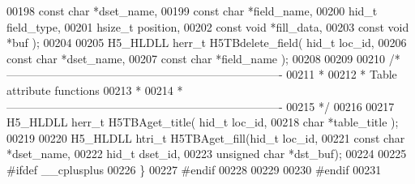 \begin{DoxyCode}
00198                          \textcolor{keyword}{const} \textcolor{keywordtype}{char} *dset\_name,
00199                          \textcolor{keyword}{const} \textcolor{keywordtype}{char} *field\_name,
00200                          hid\_t field\_type,
00201                          hsize\_t position,
00202                          \textcolor{keyword}{const} \textcolor{keywordtype}{void} *fill\_data,
00203                          \textcolor{keyword}{const} \textcolor{keywordtype}{void} *buf );
00204 
00205 H5\_HLDLL herr\_t  H5TBdelete\_field( hid\_t loc\_id,
00206                          \textcolor{keyword}{const} \textcolor{keywordtype}{char} *dset\_name,
00207                          \textcolor{keyword}{const} \textcolor{keywordtype}{char} *field\_name );
00208 
00209 
00210 \textcolor{comment}{/*-------------------------------------------------------------------------}
00211 \textcolor{comment}{ *}
00212 \textcolor{comment}{ * Table attribute functions}
00213 \textcolor{comment}{ *}
00214 \textcolor{comment}{ *-------------------------------------------------------------------------}
00215 \textcolor{comment}{ */}
00216 
00217 H5\_HLDLL herr\_t  H5TBAget\_title( hid\_t loc\_id,
00218                        \textcolor{keywordtype}{char} *table\_title );
00219 
00220 H5\_HLDLL htri\_t  H5TBAget\_fill(hid\_t loc\_id,
00221                       \textcolor{keyword}{const} \textcolor{keywordtype}{char} *dset\_name,
00222                       hid\_t dset\_id,
00223                       \textcolor{keywordtype}{unsigned} \textcolor{keywordtype}{char} *dst\_buf);
00224 
00225 \textcolor{preprocessor}{#ifdef \_\_cplusplus}
00226 \}
00227 \textcolor{preprocessor}{#endif}
00228 
00229 
00230 \textcolor{preprocessor}{#endif}
00231 
\end{DoxyCode}
